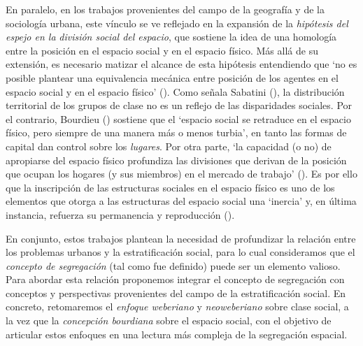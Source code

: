 \documentclass[
  spanish,
  a4paper,%
  chapterprefix=true,%
  DIV=calc,%
  twoside]{scrbook}%
\begin{document}
En paralelo, en los trabajos provenientes del campo de la geografía y de
la sociología urbana, este vínculo se ve reflejado en la expansión de la
\emph{hipótesis del espejo en la} \emph{división social del espacio}, que sostiene
la idea de una homología entre la posición en el espacio social y en el
espacio físico. Más allá de su extensión, es necesario matizar el
alcance de esta hipótesis entendiendo que `no es posible plantear una
equivalencia mecánica entre posición de los agentes en el espacio social
y en el espacio físico' (). Como señala
Sabatini (), la distribución territorial de los grupos de clase no es
un reflejo de las disparidades sociales. Por el contrario, Bourdieu () sostiene que el `espacio social se retraduce en el espacio
físico, pero siempre de una manera más o menos turbia', en tanto las
formas de capital dan control sobre los \emph{lugares}. Por otra parte, `la
capacidad (o no) de apropiarse del espacio físico profundiza las
divisiones que derivan de la posición que ocupan los hogares (y sus
miembros) en el mercado de trabajo' (). Es por
ello que la inscripción de las estructuras sociales en el espacio físico
es uno de los elementos que otorga a las estructuras del espacio social
una `inercia' y, en última instancia, refuerza su permanencia y
reproducción ().

En conjunto, estos trabajos plantean la necesidad de profundizar la
relación entre los problemas urbanos y la estratificación social, para
lo cual consideramos que el \emph{concepto de segregación} (tal como fue
definido) puede ser un elemento valioso. Para abordar esta relación
proponemos integrar el concepto de segregación con conceptos y
perspectivas provenientes del campo de la estratificación social. En
concreto, retomaremos el \emph{enfoque weberiano} y \emph{neoweberiano} sobre
clase social, a la vez que la \emph{concepción bourdiana} sobre el espacio
social, con el objetivo de articular estos enfoques en una lectura más
compleja de la segregación espacial.
\end{document}

